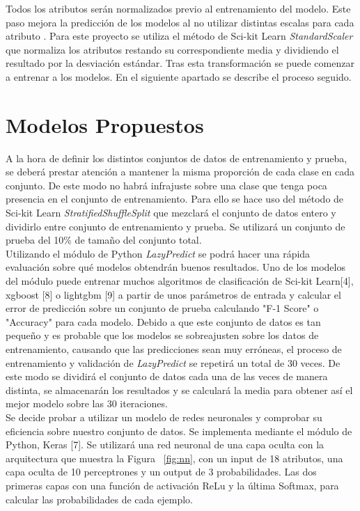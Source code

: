 \documentclass{esannV2}
\begin{document}
Todos los atributos serán normalizados previo al entrenamiento del modelo. Este paso mejora la predicción de los modelos al no utilizar distintas escalas para cada atributo . Para este proyecto se utiliza el método de Sci-kit Learn  \textit{StandardScaler} que normaliza los atributos restando su correspondiente media y dividiendo el resultado por la desviación estándar. Tras esta transformación se puede comenzar a entrenar a los modelos. En el siguiente apartado se describe el proceso seguido.

\section{Modelos Propuestos}

A la hora de definir los distintos conjuntos de datos de entrenamiento y prueba, se deberá prestar atención a mantener la misma proporción de cada clase en cada conjunto. De este modo no habrá infrajuste sobre una clase que tenga poca presencia en el conjunto de entrenamiento. Para ello se hace uso del método de Sci-kit Learn \textit{StratifiedShuffleSplit} que mezclará el conjunto de datos entero y dividirlo entre conjunto de entrenamiento y prueba. Se utilizará un conjunto de prueba del 10\% de tamaño del conjunto total.\\

Utilizando el módulo de  Python \textit{LazyPredict} se podrá hacer una rápida evaluación sobre qué modelos obtendrán buenos resultados. Uno de los modelos del módulo puede entrenar muchos algoritmos de clasificación de Sci-kit Learn[4], xgboost [8] o lightgbm [9] a partir de unos parámetros de entrada y calcular el error de predicción sobre un conjunto de prueba calculando "F-1 Score" o "Accuracy" para cada modelo. 
Debido a que este conjunto de datos es tan pequeño y es probable que los modelos se sobreajusten sobre los datos de entrenamiento, causando que las predicciones sean muy erróneas, el proceso de entrenamiento y validación de   \textit{LazyPredict}  se repetirá un total de 30 veces. De este modo se dividirá el conjunto de datos cada una de las veces de manera distinta, se almacenarán los resultados y se calculará la media para obtener así el mejor modelo sobre las 30 iteraciones. \\ 

Se decide probar a utilizar un modelo de redes neuronales y comprobar su eficiencia sobre nuestro conjunto de datos. Se implementa mediante el módulo de Python, Keras [7]. Se utilizará una red neuronal de una capa oculta con la arquitectura que muestra la Figura ~\ref{fig:nn}, con un input de 18 atributos, una capa oculta de 10 perceptrones y un output de 3 probabilidades. Las dos primeras capas con una función de activación ReLu y la última Softmax, para calcular las probabilidades de cada ejemplo. \\
\end{document}
